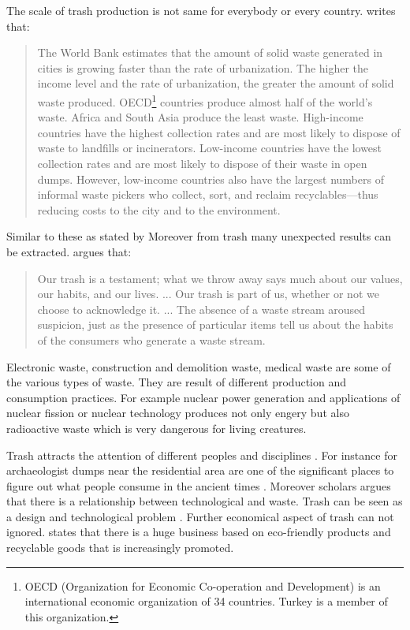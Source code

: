 The scale of trash production is not same for everybody or every country. \cite[2]{chen2015waste} writes that: 
\begin{quote}
The World Bank estimates that the amount of solid waste generated in cities is growing faster than the rate of urbanization. The higher the income level and the rate of urbanization, the greater the amount of solid waste produced. OECD\footnote{OECD (Organization for Economic Co-operation and Development) is an international economic organization of 34 countries. Turkey is a member of this organization.} countries produce almost half of the world’s waste. Africa and South Asia produce the least waste. High-income countries have the highest collection rates and are most likely to dispose of waste to landfills or incinerators. Low-income countries have the lowest collection rates and are most likely to dispose of their waste in open dumps. However, low-income countries also have the largest numbers of informal waste pickers who collect, sort, and reclaim recyclables---thus reducing costs to the city and to the environment.
\end{quote}

Similar to these as stated by \cite[16]{cerny1996recycled}  Moreover from trash many unexpected results can be extracted. \cite[xxv]{zimring2012encyclopedia} argues that:
\begin{quote}
Our trash is a testament; what we throw away says much about our values, our habits, and our lives. ... Our trash is part of us, whether or not we choose to acknowledge it. ... The absence of a waste stream aroused suspicion, just as the presence of particular items tell us about the habits of the consumers who generate a waste stream.
\end{quote}

Electronic waste, construction and demolition waste, medical waste are some of the various types of waste. They are result of different production and consumption practices. For example nuclear power generation and applications of nuclear fission or nuclear technology produces not only engery but also radioactive waste which is very dangerous for living creatures.

Trash attracts the attention of different peoples and disciplines  \citep[63]{emgin2012trashion}. For instance for archaeologist dumps near the residential area are one of the significant places to figure out what people consume in the ancient times \citep{rathje1992rubbish}. Moreover scholars argues that there is a relationship between technological and waste. Trash can be seen as a design and technological problem \citep{mcdonough2010cradle}. Further economical aspect of trash can not ignored. \cite[65]{emgin2012trashion} states that there is a huge business based on eco-friendly products and recyclable goods that is increasingly promoted.

